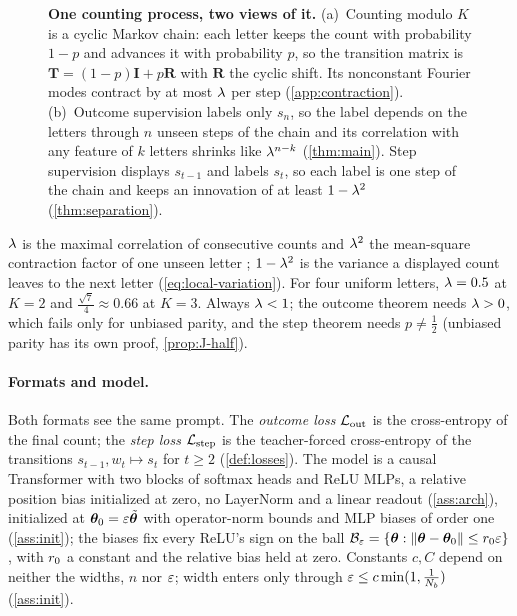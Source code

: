 \begin{figure}[t]
\centering
\resizebox{\linewidth}{!}{}
\caption{\textbf{One counting process, two views of it.}
(a)~Counting modulo $K$ is a cyclic Markov chain: each letter keeps the count with probability $1-p$ and advances it with probability
$p$, so the transition matrix is $\mathbf T=(1-p)\mathbf I+p\mathbf R$ with $\mathbf R$ the cyclic shift. Its nonconstant Fourier modes
contract by at most $\lambda$ per step (\cref{app:contraction}).
(b)~Outcome supervision labels only $s_n$, so the label depends on the letters through $n$ unseen steps of the chain and its
correlation with any feature of $k$ letters shrinks like $\lambda^{n-k}$ (\cref{thm:main}). Step supervision displays $s_{t-1}$ and labels $s_t$, so each label is one
step of the chain and keeps an innovation of at least $1-\lambda^2$ (\cref{thm:separation}).}
\label{fig:chain}
\end{figure}

$\lambda$ is the maximal correlation of consecutive counts and $\lambda^2$ the mean-square contraction factor of one unseen letter
\citep{witsenhausen1975sequences}; $1-\lambda^2$ is the variance a displayed count leaves to the next letter
(\cref{eq:local-variation}). For four uniform letters, $\lambda=0.5$ at $K=2$ and $\tfrac{\sqrt7}{4}\approx0.66$ at $K=3$. Always $\lambda<1$; the outcome theorem
needs $\lambda>0$, which fails only for unbiased parity, and the step theorem needs $p\neq\tfrac12$ (unbiased parity has its own proof, \cref{prop:J-half}).

\paragraph{Formats and model.} Both formats see the same prompt. The \emph{outcome loss} $\mathcal L_{\mathrm{out}}$ is the cross-entropy of the final
count; the \emph{step loss} $\mathcal L_{\mathrm{step}}$ is the teacher-forced cross-entropy of the transitions $s_{t-1},w_t\mapsto s_t$ for $t\ge2$
(\cref{def:losses}). The model is a causal Transformer with two blocks of softmax heads and ReLU MLPs, a relative position bias
initialized at zero, no LayerNorm and a linear readout (\cref{ass:arch}), initialized at $\bm\theta_0=\varepsilon\tilde{\bm\theta}$ with
operator-norm bounds and MLP biases of order one (\cref{ass:init}); the biases fix every ReLU's sign on the ball
$\mathcal B_{\varepsilon}=\{\bm\theta:\|\bm\theta-\bm\theta_0\|\le r_0\varepsilon\}$, with $r_0$ a constant and the relative bias held at zero. Constants $c,C$ depend on neither the widths, $n$ nor $\varepsilon$; width enters only through $\varepsilon\le c\min(1,\frac{1}{N_b})$ (\cref{ass:init}).

